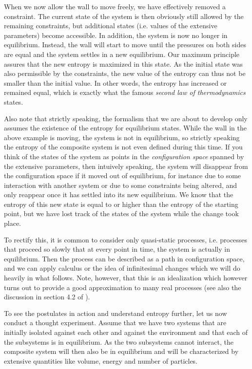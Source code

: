 \documentclass[a4paper, draft]{article}
\theoremstyle{own}
\theoremstyle{remark}
\begin{document}
When we now allow the wall to move freely, we have effectively removed a constraint. The current state of the system is then obviously still allowed by the remaining constraints, but additional states (i.e. values of the extensive parameters) become accessible. In addition, the system is now no longer in equilibrium. Instead, the wall will start to move until the pressures on both sides are equal and the system settles in a new equilibrium. Our maximum principle assures that the new entropy is maximized in this state. As the initial state was also permissible by the constraints, the new value of the entropy can thus not be smaller than the initial value. In other words, the entropy has increased or remained equal, which is exactly what the famous {\em second law of thermodynamics} states. 

Also note that strictly speaking, the formalism that we are about to develop only assumes the existence of the entropy for equilibrium states. While the wall in the above example is moving, the system is not in equilibrium, so strictly speaking the entropy of the composite system is not even defined during this time. If you think of the states of the system as points in the {\em configuration space} spanned by the extensive parameters, then intuively speaking, the system will disappear from the configuration space if it moved out of equilibrium, for instance due to some interaction with another system or due to some constraints being altered, and only reappear once it has settled into its new equilibrium. We know that the entropy of this new state is equal to or higher than the entropy of the starting point, but we have lost track of the states of the system while the change took place.

To rectify this, it is common to consider only quasi-static processes, i.e. processes that proceed so slowly that at every point in time, the system is actually in equilibrium. Then the process can be described as a path in configuration space, and we can apply calculus or the idea of infinitesimal changes which we will do heavily in what follows. Note, however, that this is an idealization which however turns out to provide a good approximation to many real processes (see also the discussion in section 4.2 of \cite{Callen}).

To see the postulates in action and understand entropy further, let us now conduct a thought experiment. Assume that we have two systems that are initially isolated against each other and against the environment and that each of the subsystems is in equilibrium. As the two subsystems cannot interact, the composite system will then also be in equilibrium and will be characterized by extensive quantities like volume, energy and number of particles.
\end{document}
